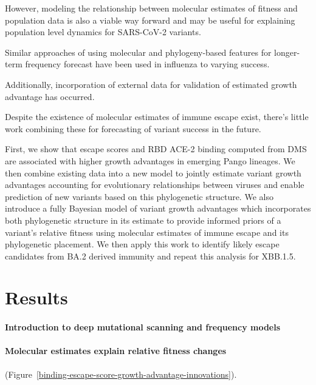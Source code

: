 \documentclass[12pt,oneside,letterpaper]{article}
\begin{document}
However, modeling the relationship between molecular estimates of fitness and  population data is also a viable way forward and may be useful for explaining population level dynamics for SARS-CoV-2 variants.

Similar approaches of using molecular and phylogeny-based features for longer-term frequency forecast have been used in influenza to varying success.

Additionally, incorporation of external data for validation of estimated growth advantage has occurred.

Despite the existence of molecular estimates of immune escape exist, there’s little work combining these for forecasting of variant success in the future.

First, we show that escape scores and RBD ACE-2 binding computed from DMS are associated with higher growth advantages in emerging Pango lineages.
We then combine existing data into a new model to jointly estimate variant growth advantages accounting for evolutionary relationships between viruses and enable prediction of new variants based on this phylogenetic structure.
We also introduce a fully Bayesian model of variant growth advantages which incorporates both phylogenetic structure in its estimate to provide informed priors of a variant's relative fitness using molecular estimates of immune escape and its phylogenetic placement.
We then apply this work to identify likely escape candidates from BA.2 derived immunity and repeat this analysis for XBB.1.5.

\section*{Results}

\paragraph{Introduction to deep mutational scanning and frequency models}%

\paragraph{Molecular estimates explain relative fitness changes}%
(Figure~\ref{binding-escape-score-growth-advantage-innovations}).
\end{document}
